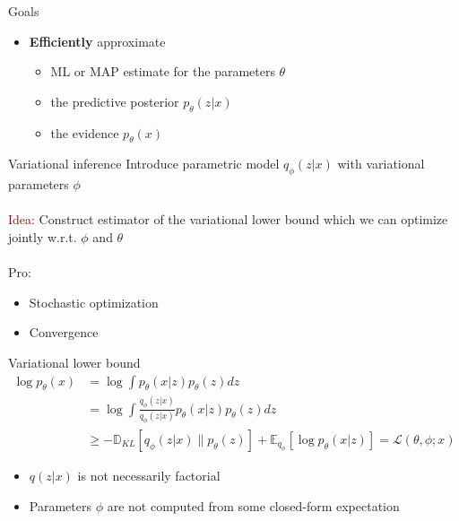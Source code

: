 \documentclass[unicode,11pt]{beamer}
\begin{document}
\begin{frame}[fragile]{Goals}
  \begin{itemize}
  \item \textbf{Efficiently} approximate
    \begin{itemize}
    \item ML or MAP estimate for the parameters $\theta$
    \item the predictive posterior $p_{\theta}(z|x)$
    \item the evidence $p_{\theta}(x)$
    \end{itemize}
  \end{itemize}
\end{frame}

\begin{frame}[fragile]{Variational inference}
  Introduce parametric model $q_{\phi}(z|x)$ with variational parameters $\phi$\\
  ~\\
  \textcolor{darkred}{Idea}: Construct estimator of the variational lower bound which we can optimize jointly
  w.r.t. $\phi$ and $\theta$\\
  ~\\
  Pro:
  \begin{itemize}
    \item Stochastic optimization
    \item Convergence
  \end{itemize}

\end{frame}

\begin{frame}[fragile]{Variational lower bound}
	\begin{align*}
		\log {p_\theta (x)} &= \log \int {p_\theta (x|z) p_\theta(z) dz} \\
		&= \log \int{ \frac{q_\phi (z|x)}{q_\phi (z|x)} p_\theta (x|z) p_{\theta}(z) dz} \\
		&\ge -\mathbb{D}_{KL}[q_\phi (z|x) \parallel p_{\theta}(z)] + \mathbb{E}_{q_{\phi}} [\log p_\theta (x|z)]
		= \mathcal{L}(\theta, \phi; x)
	\end{align*}

  \begin{itemize}
    \item $q(z|x)$ is not necessarily factorial
    \item Parameters $\phi$ are not computed from some closed-form expectation
  \end{itemize}


\end{frame}
\end{document}
